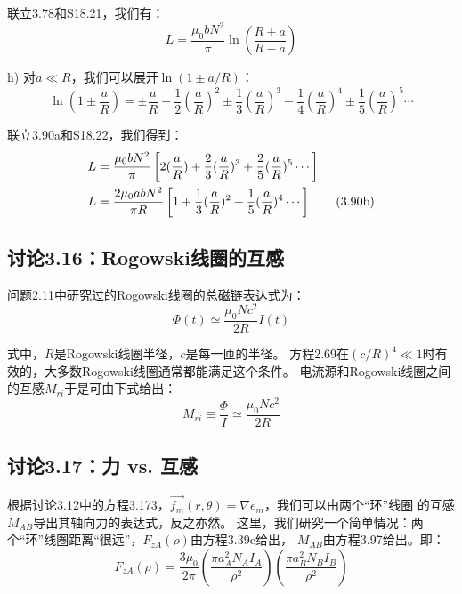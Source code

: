 联立3.78和S18.21，我们有：
 \begin{equation*}%
L=\frac{\mu_0bN^2}{\pi}\ln\left(\frac{R+a}{R-a}\right) \tag{3.90a}
\end{equation*}

h) 对$a\ll R$，我们可以展开$\ln(1\pm a/R)$：
 \begin{equation*}%
\ln(1\pm\frac{a}{R})=\pm\frac{a}{R}-\frac{1}{2}(\frac{a}{R})^2\pm\frac{1}{3}(\frac{a}{R})^3-\frac{1}{4}(\frac{a}{R})^4\pm\frac{1}{5}(\frac{a}{R})^5\cdots \tag{S18.22}
\end{equation*}

联立3.90a和S18.22，我们得到：
 \begin{align*}%
L&=\frac{\mu_0bN^2}{\pi}\left[2(\frac{a}{R})+\frac{2}{3}(\frac{a}{R})^3+\frac{2}{5}(\frac{a}{R})^5\cdots\right]\notag\\
L&=\frac{2\mu_0abN^2}{\pi R}\left[1+\frac{1}{3}(\frac{a}{R})^2+\frac{1}{5}(\frac{a}{R})^4\cdots\right]\tag{3.90b}
\end{align*}




\subsection{讨论3.16：Rogowski线圈的互感}
问题2.11中研究过的Rogowski线圈的总磁链表达式为：
 \begin{equation*}%
\Phi(t)\simeq\frac{\mu_0Nc^2}{2R}I(t) \tag{2.69}
\end{equation*}

式中，$R$是Rogowski线圈半径，$c$是每一匝的半径。
方程2.69在$(c/R)^4\ll 1$时有效的，大多数Rogowski线圈通常都能满足这个条件。
电流源和Rogowski线圈之间的互感$M_{ri}$于是可由下式给出：
\begin{equation}%
M_{ri}\equiv\frac{\Phi}{I}\simeq\frac{\mu_0Nc^2}{2R}
\end{equation}



\subsection{讨论3.17：力 vs. 互感}
根据讨论3.12中的方程3.173，$\vec{f_m}(r,\theta)=\nabla e_m$，我们可以由两个“环”线圈
的互感$M_{AB}$导出其轴向力的表达式，反之亦然。
这里，我们研究一个简单情况：两个“环”线圈距离“很远”，$F_{zA}(\rho)$由方程3.39c给出，
$M_{AB}$由方程3.97给出。即：
 \begin{equation*}%
F_{zA}(\rho)=\frac{3\mu_0}{2\pi}\left(\frac{\pi a_{A}^{2}N_AI_A}{\rho^2}\right)\left(\frac{\pi a_{B}^{2}N_BI_B}{\rho^2}\right) \tag{3.39c}
\end{equation*}

